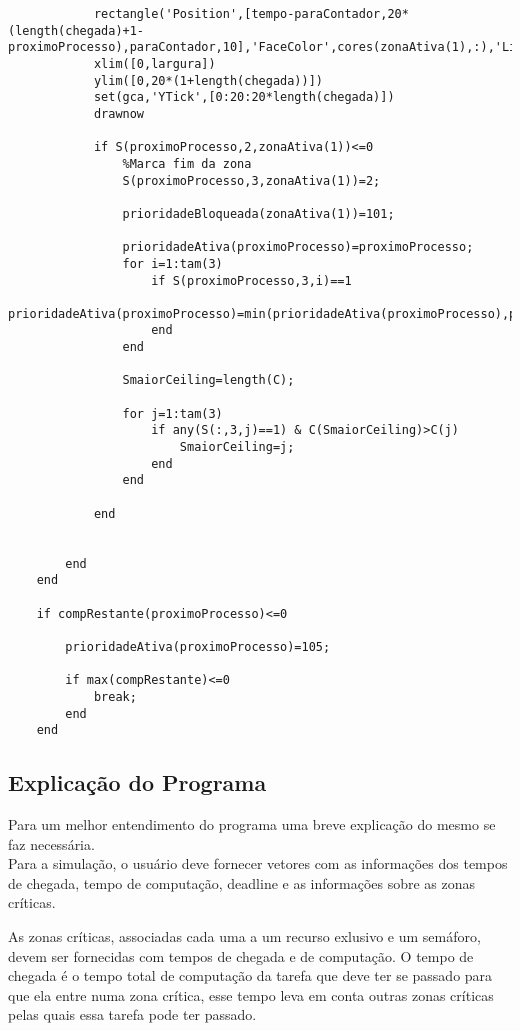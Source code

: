 \begin{lstlisting}
            rectangle('Position',[tempo-paraContador,20*(length(chegada)+1-proximoProcesso),paraContador,10],'FaceColor',cores(zonaAtiva(1),:),'LineStyle','None');
            xlim([0,largura])
            ylim([0,20*(1+length(chegada))])
            set(gca,'YTick',[0:20:20*length(chegada)])
            drawnow
            
            if S(proximoProcesso,2,zonaAtiva(1))<=0
                %Marca fim da zona
                S(proximoProcesso,3,zonaAtiva(1))=2;
                           
                prioridadeBloqueada(zonaAtiva(1))=101;
                
                prioridadeAtiva(proximoProcesso)=proximoProcesso;
                for i=1:tam(3)
                    if S(proximoProcesso,3,i)==1
                        prioridadeAtiva(proximoProcesso)=min(prioridadeAtiva(proximoProcesso),prioridadeBloqueada(i));
                    end
                end

                SmaiorCeiling=length(C);
                
                for j=1:tam(3)
                    if any(S(:,3,j)==1) & C(SmaiorCeiling)>C(j)
                        SmaiorCeiling=j;
                    end
                end
            
            end
            
            
        end
    end
    
    if compRestante(proximoProcesso)<=0
        
        prioridadeAtiva(proximoProcesso)=105;
        
        if max(compRestante)<=0
            break;
        end
    end

\end{lstlisting}

\subsection{Explicação do Programa}

Para um melhor entendimento do programa uma breve explicação do mesmo se faz necessária.\\

Para a simulação, o usuário deve fornecer vetores com as informações dos tempos de chegada, tempo de computação, deadline e as informações sobre as zonas críticas.

As zonas críticas, associadas cada uma a um recurso exlusivo e um semáforo, devem ser fornecidas com tempos de chegada e de computação.  O tempo de chegada é o tempo total de computação da tarefa que deve ter se passado para que ela entre numa zona crítica, esse tempo leva em conta outras zonas críticas pelas quais essa tarefa pode ter passado.


